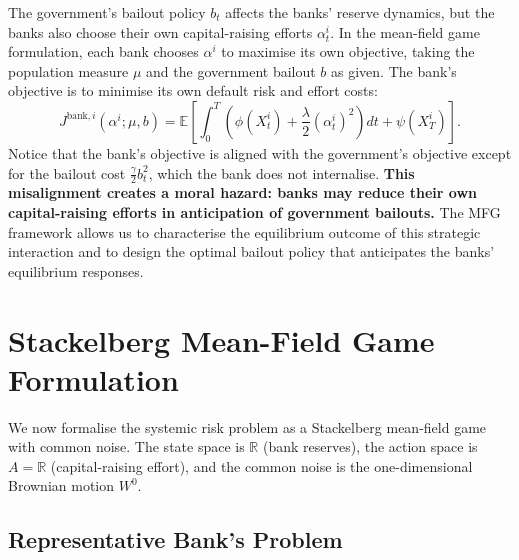 The government's bailout policy $b_t$ affects the banks' reserve dynamics, but the
banks also choose their own capital-raising efforts $\alpha_t^i$. In the mean-field
game formulation, each bank chooses $\alpha^i$ to maximise its own objective, taking
the population measure $\mu$ and the government bailout $b$ as given. The bank's
objective is to minimise its own default risk and effort costs:
\[
    J^{\mathrm{bank},i}(\alpha^i; \mu, b) = \mathbb{E}\left[ \int_0^T \left(
    \phi(X_t^i) + \frac{\lambda}{2}(\alpha_t^i)^2 \right) dt + \psi(X_T^i) \right].
\]
Notice that the bank's objective is aligned with the government's objective except
for the bailout cost $\tfrac{\gamma}{2} b_t^2$, which the bank does not internalise.
\textbf{This misalignment creates a moral hazard: banks may reduce their own
capital-raising efforts in anticipation of government bailouts.} The MFG framework
allows us to characterise the equilibrium outcome of this strategic interaction and
to design the optimal bailout policy that anticipates the banks' equilibrium
responses.


\section{Stackelberg Mean-Field Game Formulation}
\label{sec:sr-stackelberg}

We now formalise the systemic risk problem as a Stackelberg mean-field game with
common noise. The state space is $\mathbb{R}$ (bank reserves), the action space is
$A = \mathbb{R}$ (capital-raising effort), and the common noise is the
one-dimensional Brownian motion $W^0$.

\subsection{Representative Bank's Problem}

